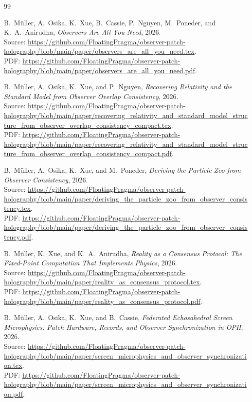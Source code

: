 \documentclass[11pt]{article}
\numberwithin{equation}{section}
\theoremstyle{remark}
\begin{document}
\begin{thebibliography}{99}

B.~M\"uller, A.~Osika, K.~Xue, B.~Cassie, P.~Nguyen, M.~Poneder, and K.~A.~Anirudha,
\emph{Observers Are All You Need},
2026.\\
Source: \url{https://github.com/FloatingPragma/observer-patch-holography/blob/main/paper/observers_are_all_you_need.tex}.\\
PDF: \url{https://github.com/FloatingPragma/observer-patch-holography/blob/main/paper/observers_are_all_you_need.pdf}.

B.~M\"uller, A.~Osika, K.~Xue, and P.~Nguyen,
\emph{Recovering Relativity and the Standard Model from Observer Overlap Consistency},
2026.\\
Source: \url{https://github.com/FloatingPragma/observer-patch-holography/blob/main/paper/recovering_relativity_and_standard_model_structure_from_observer_overlap_consistency_compact.tex}.\\
PDF: \url{https://github.com/FloatingPragma/observer-patch-holography/blob/main/paper/recovering_relativity_and_standard_model_structure_from_observer_overlap_consistency_compact.pdf}.

B.~M\"uller, A.~Osika, K.~Xue, and M.~Poneder,
\emph{Deriving the Particle Zoo from Observer Consistency},
2026.\\
Source: \url{https://github.com/FloatingPragma/observer-patch-holography/blob/main/paper/deriving_the_particle_zoo_from_observer_consistency.tex}.\\
PDF: \url{https://github.com/FloatingPragma/observer-patch-holography/blob/main/paper/deriving_the_particle_zoo_from_observer_consistency.pdf}.

B.~M\"uller, K.~Xue, and K.~A.~Anirudha,
\emph{Reality as a Consensus Protocol: The Fixed-Point Computation That Implements Physics},
2026.\\
Source: \url{https://github.com/FloatingPragma/observer-patch-holography/blob/main/paper/reality_as_consensus_protocol.tex}.\\
PDF: \url{https://github.com/FloatingPragma/observer-patch-holography/blob/main/paper/reality_as_consensus_protocol.pdf}.

B.~M\"uller, A.~Osika, K.~Xue, and B.~Cassie,
\emph{Federated Echosahedral Screen Microphysics: Patch Hardware, Records, and Observer Synchronization in OPH},
2026.\\
Source: \url{https://github.com/FloatingPragma/observer-patch-holography/blob/main/paper/screen_microphysics_and_observer_synchronization.tex}.\\
PDF: \url{https://github.com/FloatingPragma/observer-patch-holography/blob/main/paper/screen_microphysics_and_observer_synchronization.pdf}.


\end{thebibliography}
\end{document}
